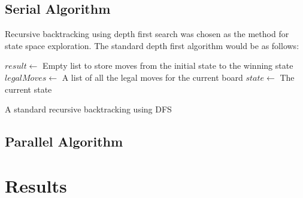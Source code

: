 \documentclass[12pt,a4paper]{report}
\begin{document}
\subsection*{Serial Algorithm}
Recursive backtracking using depth first search was chosen as the method for state space exploration. The standard depth first algorithm would be as follows:
\begin{algorithm}[]

  \BlankLine
  $result\leftarrow$ Empty list to store moves from the initial state to the winning state
  $legalMoves\leftarrow$ A list of all the legal moves for the current board\;
  $state\leftarrow$ The current state\;
 \caption{A standard recursive backtracking using DFS}
\end{algorithm}

\subsection*{Parallel Algorithm}

\section*{Results}
\end{document}
